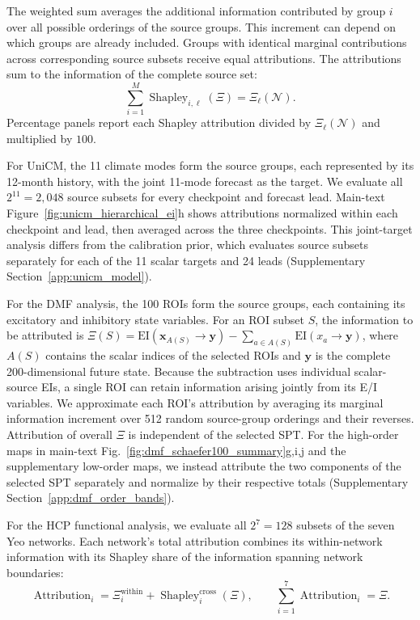 The weighted sum averages the additional information contributed by group \(i\) over all possible orderings of the source groups. This increment can depend on which groups are already included. Groups with identical marginal contributions across corresponding source subsets receive equal attributions. The attributions sum to the information of the complete source set:
\begin{equation}
\sum_{i=1}^{M}\operatorname{Shapley}_{i,\ell}(\Xi)
=
\Xi_{\ell}(\mathcal{N}).
\label{eq:shapley_reporting}
\end{equation}
Percentage panels report each Shapley attribution divided by \(\Xi_{\ell}(\mathcal{N})\) and multiplied by \(100\).

For UniCM, the 11 climate modes form the source groups, each represented by its 12-month history, with the joint 11-mode forecast as the target. We evaluate all \(2^{11}=2{,}048\) source subsets for every checkpoint and forecast lead. Main-text Figure~\ref{fig:unicm_hierarchical_ei}h shows attributions normalized within each checkpoint and lead, then averaged across the three checkpoints. This joint-target analysis differs from the calibration prior, which evaluates source subsets separately for each of the 11 scalar targets and 24 leads (Supplementary Section~\ref{app:unicm_model}).

For the DMF analysis, the 100 ROIs form the source groups, each containing its excitatory and inhibitory state variables. For an ROI subset $S$, the information to be attributed is $\Xi(S)=\mathrm{EI}(\boldsymbol{x}_{A(S)}\to\boldsymbol{y})-\sum_{a\in A(S)}\mathrm{EI}(x_a\to\boldsymbol{y})$, where $A(S)$ contains the scalar indices of the selected ROIs and $\boldsymbol{y}$ is the complete 200-dimensional future state. Because the subtraction uses individual scalar-source EIs, a single ROI can retain information arising jointly from its E/I variables. We approximate each ROI's attribution by averaging its marginal information increment over 512 random source-group orderings and their reverses. Attribution of overall $\Xi$ is independent of the selected SPT. For the high-order maps in main-text Fig.~\ref{fig:dmf_schaefer100_summary}g,i,j and the supplementary low-order maps, we instead attribute the two components of the selected SPT separately and normalize by their respective totals (Supplementary Section~\ref{app:dmf_order_bands}).

For the HCP functional analysis, we evaluate all $2^7=128$ subsets of the seven Yeo networks. Each network's total attribution combines its within-network information with its Shapley share of the information spanning network boundaries:
\begin{equation}
\operatorname{Attribution}_{i}
=
\Xi_i^{\mathrm{within}}
+
\operatorname{Shapley}_{i}^{\mathrm{cross}}(\Xi),
\qquad
\sum_{i=1}^{7}\operatorname{Attribution}_{i}=\Xi.
\label{eq:brain_total_shapley_attribution}
\end{equation}

